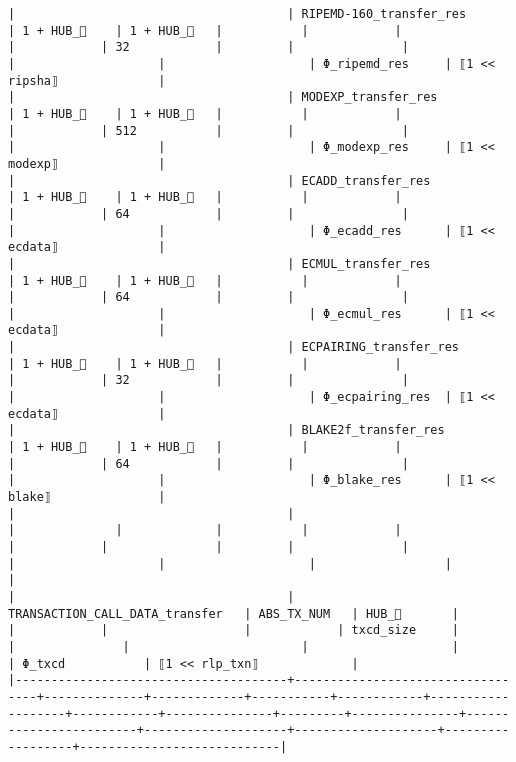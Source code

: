 \documentclass[varwidth=\maxdimen,margin=0.5cm,multi={verbatim}]{standalone}
\begin{document}
\begin{verbatim}
|                                      | RIPEMD-160_transfer_res          | 1 + HUB_    | 1 + HUB_   |           |            |                   |            | 32            |         |               |                        |                    |                    | Φ_ripemd_res     | ⟦1 << ripsha⟧              |
|                                      | MODEXP_transfer_res              | 1 + HUB_    | 1 + HUB_   |           |            |                   |            | 512           |         |               |                        |                    |                    | Φ_modexp_res     | ⟦1 << modexp⟧              |
|                                      | ECADD_transfer_res               | 1 + HUB_    | 1 + HUB_   |           |            |                   |            | 64            |         |               |                        |                    |                    | Φ_ecadd_res      | ⟦1 << ecdata⟧              |
|                                      | ECMUL_transfer_res               | 1 + HUB_    | 1 + HUB_   |           |            |                   |            | 64            |         |               |                        |                    |                    | Φ_ecmul_res      | ⟦1 << ecdata⟧              |
|                                      | ECPAIRING_transfer_res           | 1 + HUB_    | 1 + HUB_   |           |            |                   |            | 32            |         |               |                        |                    |                    | Φ_ecpairing_res  | ⟦1 << ecdata⟧              |
|                                      | BLAKE2f_transfer_res             | 1 + HUB_    | 1 + HUB_   |           |            |                   |            | 64            |         |               |                        |                    |                    | Φ_blake_res      | ⟦1 << blake⟧               |
|                                      |                                  |              |             |           |            |                   |            |               |         |               |                        |                    |                    |                  |                            |
|                                      | TRANSACTION_CALL_DATA_transfer   | ABS_TX_NUM   | HUB_       |           |            |                   |            | txcd_size     |         |               |                        |                    |                    | Φ_txcd           | ⟦1 << rlp_txn⟧             |
|--------------------------------------+----------------------------------+--------------+-------------+-----------+------------+-------------------+------------+---------------+---------+---------------+------------------------+--------------------+--------------------+------------------+----------------------------|

\end{verbatim}
\end{document}
